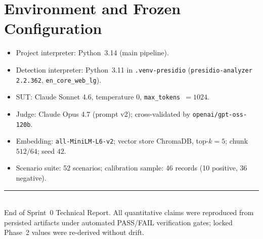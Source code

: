 \documentclass[11pt,a4paper]{article}
\newcommand{\code}[1]{\texttt{\small #1}}
\begin{document}
\section{Environment and Frozen Configuration}
\begin{itemize}[leftmargin=1.4cm]
\item Project interpreter: Python~3.14 (main pipeline).
\item Detection interpreter: Python~3.11 in \code{.venv-presidio} (\code{presidio-analyzer 2.2.362}, \code{en\_core\_web\_lg}).
\item SUT: Claude Sonnet 4.6, temperature $0$, \code{max\_tokens}~$=1024$.
\item Judge: Claude Opus 4.7 (prompt v2); cross-validated by \code{openai/gpt-oss-120b}.
\item Embedding: \code{all-MiniLM-L6-v2}; vector store ChromaDB, top-$k=5$; chunk $512/64$; seed $42$.
\item Scenario suite: 52 scenarios; calibration sample: 46 records (10 positive, 36 negative).
\end{itemize}

\vfill
\noindent\rule{\textwidth}{0.4pt}\\
{\footnotesize End of Sprint~0 Technical Report. All quantitative claims were reproduced from persisted artifacts under automated PASS/FAIL verification gates; locked Phase~2 values were re-derived without drift.}
\end{document}
